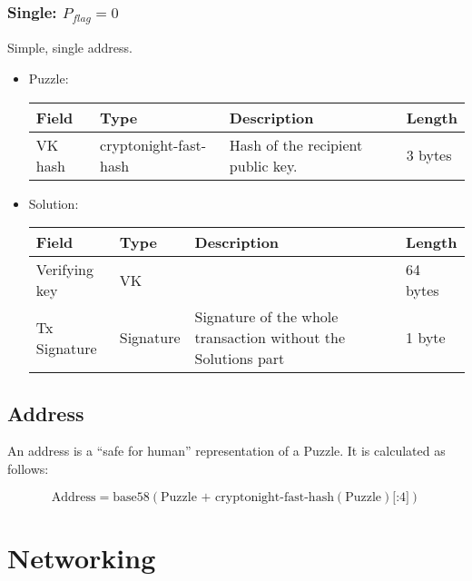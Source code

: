 \documentclass[a4paper,10pt]{article}
\begin{document}
            \subsubsection{Single: $P_{flag} = 0$}
                Simple, single address.
                \begin{itemize}
                 \item Puzzle:\\
                    
                    \begin{tabularx}{\textwidth}{|l|l|X|l|}
                        \hline Field & Type & Description & Length \\ \hline
                        \hline VK hash & cryptonight-fast-hash & Hash of the recipient public key. & 3 bytes \\
                        \hline
                    \end{tabularx}
                 \item Solution:\\
                 
                    \begin{tabularx}{\textwidth}{|l|l|X|l|}
                        \hline Field & Type & Description & Length \\ \hline
                        \hline Verifying key & VK &  & 64 bytes \\
                        \hline Tx Signature & Signature & Signature of the whole transaction without the Solutions part & 1 byte \\
                        \hline
                    \end{tabularx}
                \end{itemize}
        
        \subsection{Address}
            An address is a ``safe for human'' representation of a Puzzle.
            It is calculated as follows:
            
            $$\text{Address} = \text{base58}(\text{Puzzle + cryptonight-fast-hash}(\text{Puzzle})\text{[:4]})$$

                

    \section{Networking}
\end{document}
